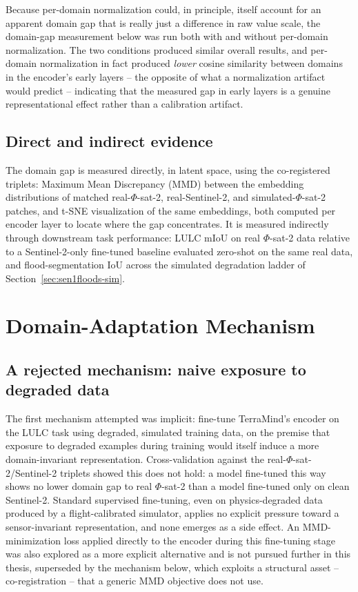 Because per-domain normalization could, in principle, itself account for an apparent domain gap that is really just a difference in raw value scale, the domain-gap measurement below was run both with and without per-domain normalization.
The two conditions produced similar overall results, and per-domain normalization in fact produced \emph{lower} cosine similarity between domains in the encoder's early layers -- the opposite of what a normalization artifact would predict -- indicating that the measured gap in early layers is a genuine representational effect rather than a calibration artifact.

\subsection{Direct and indirect evidence}

The domain gap is measured directly, in latent space, using the co-registered triplets: Maximum Mean Discrepancy (MMD) between the embedding distributions of matched real-$\Phi$-sat-2, real-Sentinel-2, and simulated-$\Phi$-sat-2 patches, and t-SNE visualization of the same embeddings, both computed per encoder layer to locate where the gap concentrates.
It is measured indirectly through downstream task performance: LULC mIoU on real $\Phi$-sat-2 data relative to a Sentinel-2-only fine-tuned baseline evaluated zero-shot on the same real data, and flood-segmentation IoU across the simulated degradation ladder of Section~\ref{sec:sen1floods-sim}.

\section{Domain-Adaptation Mechanism}
\label{sec:da-mechanism}

\subsection{A rejected mechanism: naive exposure to degraded data}
\label{sec:da-negative-result}

The first mechanism attempted was implicit: fine-tune TerraMind's encoder on the LULC task using degraded, simulated training data, on the premise that exposure to degraded examples during training would itself induce a more domain-invariant representation.
Cross-validation against the real-$\Phi$-sat-2/Sentinel-2 triplets showed this does not hold: a model fine-tuned this way shows no lower domain gap to real $\Phi$-sat-2 than a model fine-tuned only on clean Sentinel-2.
Standard supervised fine-tuning, even on physics-degraded data produced by a flight-calibrated simulator, applies no explicit pressure toward a sensor-invariant representation, and none emerges as a side effect.
An MMD-minimization loss applied directly to the encoder during this fine-tuning stage was also explored as a more explicit alternative and is not pursued further in this thesis, superseded by the mechanism below, which exploits a structural asset -- co-registration -- that a generic MMD objective does not use.

